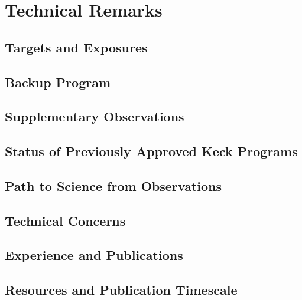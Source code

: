 \documentclass[11pt,preprint]{aastex}
\begin{document}



\section{Technical Remarks}

\subsection{Targets and Exposures}

\subsection{Backup Program}

\subsection{Supplementary Observations}

\subsection{Status of Previously Approved Keck Programs}



\subsection{Path to Science from Observations}

\subsection{Technical Concerns}

\subsection{Experience and Publications}

\subsection{Resources and Publication Timescale}
\end{document}
